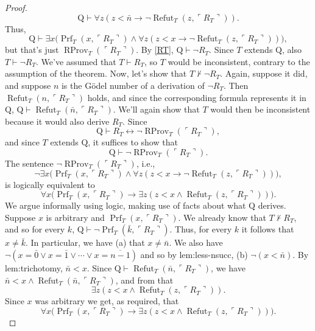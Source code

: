 \begin{proof}
\[\mathrm Q\vdash\forall z(z<\bar n\to\neg\operatorname{Refut}_T(z,\ulcorner R_T\urcorner)).\]
Thus,
\[\mathrm Q\vdash\exists x\bigl(\operatorname{Prf}_T(x,\ulcorner R_T\urcorner)\land\forall z(z<x\to\neg\operatorname{Refut}_T(z,\ulcorner R_T\urcorner))\bigr),\]
but that's just $\operatorname{RProv}_T(\ulcorner R_T\urcorner)$. By \eqref{RT}, $\mathrm Q\vdash\neg R_T$. Since $T$ extends $\mathrm Q$, also $T\vdash\neg R_T$. We've assumed that $T\vdash R_T$, so $T$ would be inconsistent, contrary to the assumption of the theorem.
Now, let's show that $T\nvdash\neg R_T$. Again, suppose it did, and suppose $n$ is the G\"odel number of a derivation of $\neg R_T$. Then $\operatorname{Refut}_T(n,\ulcorner R_T\urcorner)$ holds, and since the corresponding formula represents it in $\mathrm Q$, $\mathrm Q\vdash\operatorname{Refut}_T(\bar n,\ulcorner R_T\urcorner)$. We'll again show that $T$ would then be inconsistent because it would also derive $R_T$. Since
\[\mathrm Q\vdash R_T\leftrightarrow\neg\operatorname{RProv}_T(\ulcorner R_T\urcorner),\]
and since $T$ extends $\mathrm Q$, it suffices to show that
\[\mathrm Q\vdash\neg\operatorname{RProv}_T(\ulcorner R_T\urcorner).\]
The sentence $\neg\operatorname{RProv}_T(\ulcorner R_T\urcorner)$, i.e.,
\[\neg\exists x\bigl(\operatorname{Prf}_T(x,\ulcorner R_T\urcorner)\land\forall z(z<x\to\neg\operatorname{Refut}_T(z,\ulcorner R_T\urcorner))\bigr),\]
is logically equivalent to
\[\forall x\bigl(\operatorname{Prf}_T(x,\ulcorner R_T\urcorner)\to\exists z(z<x\land\operatorname{Refut}_T(z,\ulcorner R_T\urcorner))\bigr).\]
We argue informally using logic, making use of facts about what $\mathrm Q$ derives. Suppose $x$ is arbitrary and $\operatorname{Prf}_T(x,\ulcorner R_T\urcorner)$. We already know that $T\nvdash R_T$, and so for every $k$, $\mathrm Q\vdash\neg\operatorname{Prf}_T(\bar k,\ulcorner R_T\urcorner)$. Thus, for every $k$ it follows that $x\ne\bar k$. In particular, we have (a) that $x\ne\bar n$. We also have $\neg(x=\bar0\lor x=\bar1\lor\cdots\lor x=\overline{n-1})$ and so by \textsf{lem:less-nsucc}, (b) $\neg(x<\bar n)$. By \textsf{lem:trichotomy}, $\bar n<x$. Since $\mathrm Q\vdash\operatorname{Refut}_T(\bar n,\ulcorner R_T\urcorner)$, we have $\bar n<x\land\operatorname{Refut}_T(\bar n,\ulcorner R_T\urcorner)$, and from that
\[\exists z(z<x\land\operatorname{Refut}_T(z,\ulcorner R_T\urcorner)).\]
Since $x$ was arbitrary we get, as required, that
\[\forall x\bigl(\operatorname{Prf}_T(x,\ulcorner R_T\urcorner)\to\exists z(z<x\land\operatorname{Refut}_T(z,\ulcorner R_T\urcorner))\bigr).\]
\end{proof}
